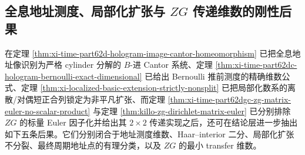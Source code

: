 \subsection{全息地址测度、局部化扩张与 \texorpdfstring{$ZG$}{ZG} 传递维数的刚性后果}\label{subsec:conclusion-holographic-localized-zg-rigidity}
在定理 \ref{thm:xi-time-part62d-hologram-image-cantor-homeomorphism} 已把全息地址像识别为严格 cylinder 分解的 \(B\)-进 Cantor 系统、定理 \ref{thm:xi-time-part62dc-hologram-bernoulli-exact-dimensional} 已给出 Bernoulli 推前测度的精确维数公式、定理 \ref{thm:xi-localized-basic-extension-strictly-nonsplit} 已把局部化数系的离散/对偶短正合列锁定为非平凡扩张、而定理 \ref{thm:xi-time-part62dgc-zg-matrix-euler-no-scalar-product} 与定理 \ref{thm:killo-zg-dirichlet-matrix-euler} 已分别排除 \(ZG\) 的标量 Euler 因子化并给出其 \(2\times 2\) 传递实现之后，还可在结论层进一步抽出如下五条后果。它们分别闭合于地址测度维数、Haar--interior 二分、局部化扩张不分裂、最终周期地址点的有理分类，以及 \(ZG\) 的最小 transfer 维数。

